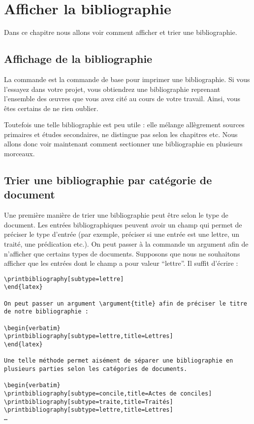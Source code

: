 \chapter{Afficher la bibliographie}

\begin{prealable}

Dans ce chapitre nous allons voir comment afficher et trier une bibliographie.
\end{prealable}


\section{Affichage de la bibliographie}

La commande  est la commande de base pour imprimer une bibliographie. Si vous l'essayez dans votre projet, vous obtiendrez une bibliographie reprenant l'ensemble des œuvres que vous avez cité au cours de votre travail. Ainsi, vous êtes certains de ne rien oublier.

Toutefois une telle bibliographie est peu utile : elle mélange allègrement sources primaires et études secondaires, ne distingue pas selon les chapitres etc. Nous allons donc voir maintenant comment sectionner une bibliographie en plusieurs morceaux.

\section{Trier une bibliographie par catégorie de document}

Une première manière de trier une bibliographie peut être selon le type de document. Les entrées bibliographiques peuvent avoir un champ  qui permet de préciser le type d'entrée (par exemple, préciser si une entrée est une lettre, un traité, une prédication etc.). On peut passer à la commande  un argument afin de n'afficher que certains types de documents. Supposons que nous ne souhaitons afficher que les entrées dont le champ  a pour valeur \enquote{lettre}. Il suffit d'écrire :

\begin{verbatim}
\printbibliography[subtype=lettre]
\end{latex}

On peut passer un argument \argument{title} afin de préciser le titre de notre bibliographie :

\begin{verbatim}
\printbibliography[subtype=lettre,title=Lettres]
\end{latex}

Une telle méthode permet aisément de séparer une bibliographie en plusieurs parties selon les catégories de documents.

\begin{verbatim}
\printbibliography[subtype=concile,title=Actes de conciles]
\printbibliography[subtype=traite,title=Traités]
\printbibliography[subtype=lettre,title=Lettres]
…

\end{verbatim}

